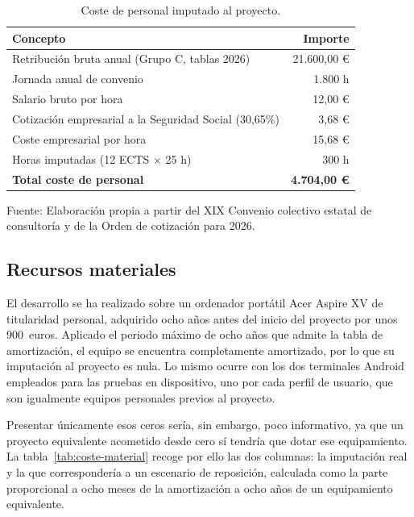 \begin{table}[htbp]
    \centering
    \caption{Coste de personal imputado al proyecto.}
    \label{tab:coste-personal}
    \begin{tabularx}{\textwidth}{@{}>{\RaggedRight\arraybackslash}X r@{}}
        \toprule
        \textbf{Concepto} & \textbf{Importe} \\
        \midrule
        Retribución bruta anual (Grupo C, tablas 2026)        & 21.600,00 € \\
        Jornada anual de convenio                             & 1.800 h \\
        Salario bruto por hora                                & 12,00 € \\
        Cotización empresarial a la Seguridad Social (30,65\%) & 3,68 € \\
        \midrule
        Coste empresarial por hora                            & 15,68 € \\
        Horas imputadas (12 ECTS $\times$ 25 h)               & 300 h \\
        \midrule
        \textbf{Total coste de personal}                      & \textbf{4.704,00 €} \\
        \bottomrule
    \end{tabularx}

    \vspace{2pt}
    {\footnotesize Fuente: Elaboración propia a partir del XIX Convenio colectivo estatal de consultoría y
    de la Orden de cotización para 2026.}
\end{table}

\subsection{Recursos materiales}

El desarrollo se ha realizado sobre un ordenador portátil Acer Aspire XV de titularidad personal, adquirido
ocho años antes del inicio del proyecto por unos 900~euros. Aplicado el periodo máximo de ocho años que
admite la tabla de amortización, el equipo se encuentra completamente amortizado, por lo que su
imputación al proyecto es nula. Lo mismo ocurre con los dos terminales Android empleados para las pruebas
en dispositivo, uno por cada perfil de usuario, que son igualmente equipos personales previos al proyecto.

Presentar únicamente esos ceros sería, sin embargo, poco informativo, ya que un proyecto equivalente
acometido desde cero sí tendría que dotar ese equipamiento. La tabla~\ref{tab:coste-material} recoge por
ello las dos columnas: la imputación real y la que correspondería a un escenario de reposición, calculada
como la parte proporcional a ocho meses de la amortización a ocho años de un equipamiento equivalente.

